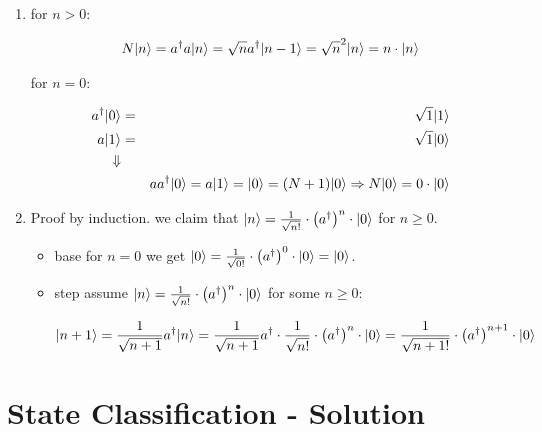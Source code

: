\documentclass[a4paper,10pt]{hw}
\DeclarePairedDelimiter\ket{\lvert}{\rangle}
\begin{document}
\begin{enumerate}
\item
for $n>0$:

\begin{align*}
N\ket{n} = a^\dagger a \ket{n} =  \sqrt{n} a^\dagger \ket{n-1} = \sqrt{n}^2 \ket{n} = n\cdot \ket{n}
\end{align*}

for $n=0$:

\begin{align*}
a^\dagger \ket{0} &=& \sqrt{1}\ket{1} \\
a \ket{1} &=& \sqrt{1} \ket{0}\\
\Downarrow \\
&& a a^\dagger \ket{0} = a\ket{1} = \ket{0} = (N + 1)\ket{0} \Rightarrow N\ket{0} = 0\cdot\ket{0}
\end{align*}


\item

Proof by induction. we claim that $\ket{n} = \frac{1}{\sqrt{n!}} \cdot \left( a^\dagger \right) ^n \cdot \ket{0}$ for $n \geq 0$.

	\begin{itemize}
	
	\item base
	for $n=0$ we get $\ket{0} = \frac{1}{\sqrt{0!}} \cdot \left( a^\dagger \right)^0 \cdot \ket{0} = \ket{0}$. 
	
	\item step
	assume $\ket{n} = \frac{1}{\sqrt{n!}} \cdot \left( a^\dagger \right) ^n \cdot \ket{0}$ for some $n \geq 0$:
	
	\begin{align*}
	\ket{n+1} &= \frac{1}{\sqrt{n+1}} a^\dagger \ket{n} = \frac{1}{\sqrt{n+1}} a^\dagger\cdot  \frac{1}{\sqrt{n!}} \cdot \left( a^\dagger \right) ^n \cdot \ket{0} = \frac{1}{\sqrt{n+1!}} \cdot \left( a^\dagger \right) ^{n+1} \cdot \ket{0}
	\end{align*}
	
	\end{itemize}

\end{enumerate}

\section{State Classification - Solution}
\end{document}
